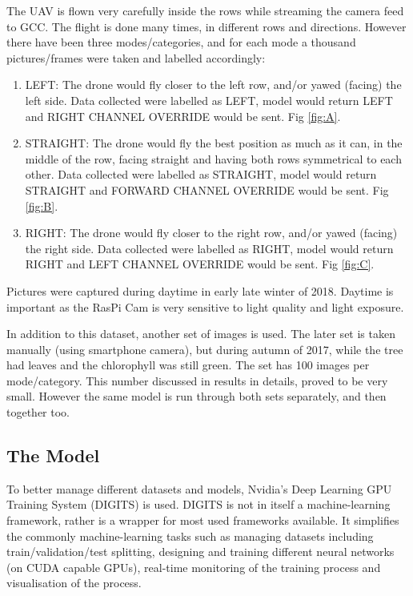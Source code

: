 \documentclass[conference]{IEEEtran}
\begin{document}
The UAV is flown very carefully inside the rows while streaming the camera feed to GCC. The flight is done many times, in different rows and directions. However there have been three modes/categories, and for each mode a thousand pictures/frames were taken and labelled accordingly:
\begin{enumerate}
    \item LEFT: The drone would fly closer to the left row, and/or yawed (facing) the left side. Data collected were labelled as LEFT, model would return LEFT and RIGHT CHANNEL OVERRIDE would be sent. Fig \ref{fig:A}.
    \item STRAIGHT: The drone would fly the best position as much as it can, in the middle of the row, facing straight and having both rows symmetrical to each other. Data collected were labelled as STRAIGHT, model would return STRAIGHT and FORWARD CHANNEL OVERRIDE would be sent. Fig \ref{fig:B}.
    \item RIGHT: The drone would fly closer to the right row, and/or yawed (facing) the right side. Data collected were labelled as RIGHT, model would return RIGHT and LEFT CHANNEL OVERRIDE would be sent. Fig \ref{fig:C}.
\end{enumerate}

Pictures were captured during daytime in early late winter of 2018. Daytime is important as the RasPi Cam is very sensitive to light quality and light exposure.

In addition to this dataset, another set of images is used. The later set is taken manually (using smartphone camera), but during autumn of 2017, while the tree had leaves and the chlorophyll was still green. The set has 100 images per mode/category. This number discussed in results in details, proved to be very small. However the same model is run through both sets separately, and then together too.
\subsection{The Model}
To better manage different datasets and models, Nvidia's Deep Learning GPU Training System (DIGITS) is used. DIGITS is not in itself a machine-learning framework, rather is a wrapper for most used frameworks available. It simplifies the commonly machine-learning tasks such as managing datasets including train/validation/test splitting, designing and training different neural networks (on CUDA capable GPUs), real-time monitoring of the training process and visualisation of the process.
\end{document}
